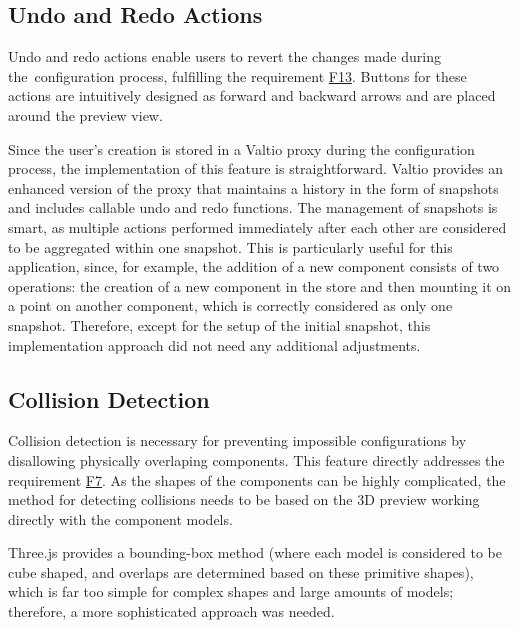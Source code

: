 \subsection{Undo and Redo Actions}

Undo and redo actions enable users to revert the changes made during the~configuration process, fulfilling the requirement \hyperref[itm:F13]{F13}. Buttons for these actions are intuitively designed as forward and backward arrows and are placed around the preview view.

Since the user's creation is stored in a Valtio proxy during the configuration process, the implementation of this feature is straightforward. Valtio provides an enhanced version of the proxy that maintains a history in the form of snapshots and includes callable undo and redo functions. The management of snapshots is smart, as multiple actions performed immediately after each other are considered to be aggregated within one snapshot. This is particularly useful for this application, since, for example, the addition of a new component consists of two operations: the creation of a new component in the store and then mounting it on a point on another component, which is correctly considered as only one snapshot. Therefore, except for the setup of the initial snapshot, this implementation approach did not need any additional adjustments.


\subsection{Collision Detection}

Collision detection is necessary for preventing impossible configurations by disallowing physically overlaping components. This feature directly addresses the requirement \hyperref[itm:F7]{F7}. As the shapes of the components can be highly complicated, the method for detecting collisions needs to be based on the 3D preview working directly with the component models.

Three.js provides a bounding-box method (where each model is considered to be cube shaped, and overlaps are determined based on these primitive shapes), which is far too simple for complex shapes and large amounts of models; therefore, a more sophisticated approach was needed. 

